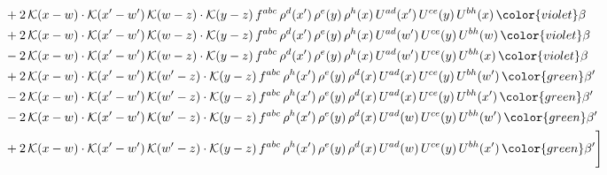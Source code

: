 \begin{align}
&+2\,\mathcal{K}(x-w)\cdot\mathcal{K}(x'-w')\,\mathcal{K}(w-z)\cdot\mathcal{K}(y-z)\, f^{abc}\,\rho^{d}(x')\,\rho^{e}(y)\,\rho^{h}(x)\,U^{ad}(x')\,U^{ce}(y)\,U^{bh}(x)\,{\color{violet} \beta}\notag \\ & +2\,\mathcal{K}(x-w)\cdot\mathcal{K}(x'-w')\,\mathcal{K}(w-z)\cdot\mathcal{K}(y-z)\, f^{abc}\,\rho^{d}(x')\,\rho^{e}(y)\,\rho^{h}(x)\,U^{ad}(w')\,U^{ce}(y)\,U^{bh}(w)\,{\color{violet} \beta} \notag\\ & -2\,\mathcal{K}(x-w)\cdot\mathcal{K}(x'-w')\,\mathcal{K}(w-z)\cdot\mathcal{K}(y-z)\, f^{abc}\,\rho^{d}(x')\,\rho^{e}(y)\,\rho^{h}(x)\,U^{ad}(w')\,U^{ce}(y)\,U^{bh}(x)\,{\color{violet} \beta}\notag\\ & +2\,\mathcal{K}(x-w)\cdot\mathcal{K}(x'-w')\,\mathcal{K}(w'-z)\cdot\mathcal{K}(y-z)\, f^{abc}\,\rho^{h}(x')\,\rho^{e}(y)\,\rho^{d}(x)\,U^{ad}(x)\,U^{ce}(y)\,U^{bh}(w')\,{\color{green}\beta'}\notag \\ & -2\,\mathcal{K}(x-w)\cdot\mathcal{K}(x'-w')\,\mathcal{K}(w'-z)\cdot\mathcal{K}(y-z)\, f^{abc}\,\rho^{h}(x')\,\rho^{e}(y)\,\rho^{d}(x)\,U^{ad}(x)\,U^{ce}(y)\,U^{bh}(x')\,{\color{green}\beta'} \notag\\ & -2\,\mathcal{K}(x-w)\cdot\mathcal{K}(x'-w')\,\mathcal{K}(w'-z)\cdot\mathcal{K}(y-z)\, f^{abc}\,\rho^{h}(x')\,\rho^{e}(y)\,\rho^{d}(x)\,U^{ad}(w)\,U^{ce}(y)\,U^{bh}(w')\,{\color{green}\beta'} \notag\\ & +2\,\mathcal{K}(x-w)\cdot\mathcal{K}(x'-w')\,\mathcal{K}(w'-z)\cdot\mathcal{K}(y-z)\, f^{abc}\,\rho^{h}(x')\,\rho^{e}(y)\,\rho^{d}(x)\,U^{ad}(w)\,U^{ce}(y)\,U^{bh}(x')\,{\color{green}\beta'}\Bigg]
\end{align}
